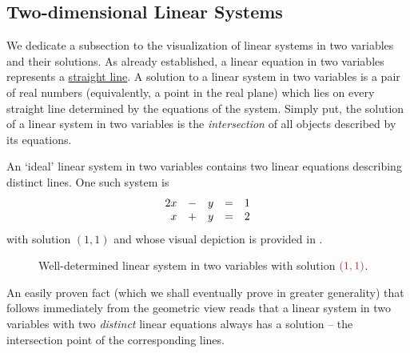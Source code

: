 \subsection{Two-dimensional Linear Systems}
\label{ssec:two-dimensional-linear-systems}

We dedicate a subsection to the visualization of linear systems in two variables
and their solutions. As already established, a linear equation in two variables
represents a \hyperref[def:straight-line]{straight line}. A solution to a linear
system in two variables is a pair of real numbers (equivalently, a point in the
real plane) which lies on every straight line determined by the equations of the
system. Simply put, the solution of a linear system in two variables is the
\emph{intersection} of all objects described by its equations.

An `ideal' linear system in two variables contains two linear equations
describing distinct lines. One such system is
\[
 \begin{array}{r c r c r}
  2x & - & y & = & 1\\
  x & + & y & = & 2
 \end{array}
\]
with solution $(1,1)$ and whose visual depiction is provided in
.

\begin{figure}[ht]
 \centering

 \caption{Well-determined linear system in two variables with solution
 $\clr{(1,1)}$.}
 \label{fig:well-determined-system}
\end{figure}

An easily proven fact (which we shall eventually prove in greater generality)
that follows immediately from the geometric view reads that a linear system in
two variables with two \emph{distinct} linear equations always has a solution --
the intersection point of the corresponding lines.

